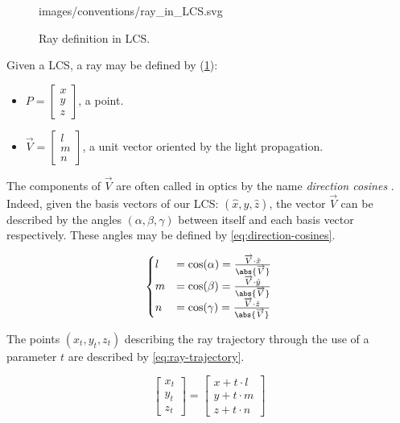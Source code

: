 \begin{figure} \caption{\label{fig:ray-in-LCS} Ray definition
in \gls{LCS}.}

           {images/conventions/ray_in_LCS.svg}
\end{figure}

Given a \gls{LCS}, a ray may be defined by (\cref{fig:ray-in-LCS}):
\begin{itemize}
\item $P = \begin{bmatrix}x \\ y \\ z \end{bmatrix}$, a point.
\item $\overrightarrow{V} = \begin{bmatrix} l \\ m \\ n \end{bmatrix}$, a unit
vector oriented by the light propagation.
\end{itemize}

The components of $\overrightarrow{V}$ are often called in optics by the name
\emph{direction cosines} \cite{mathworld:direction-cosine}. Indeed, given the
basis vectors of our \gls{LCS}: $(\hat{x}, \hat{y}, \hat{z})$, the vector
$\overrightarrow{V}$ can be described by the angles $(\alpha, \beta, \gamma)$
between itself and each basis vector respectively. These angles may be defined
by \cref{eq:direction-cosines}.

\begin{equation} \label{eq:direction-cosines}
\begin{cases}
l &= \cos(\alpha) = \frac{\overrightarrow{V} \cdot \hat{x}}
                          {\abs{\overrightarrow{V}}} \\
m &= \cos(\beta) = \frac{\overrightarrow{V} \cdot \hat{y}}
                         {\abs{\overrightarrow{V}}} \\
n &= \cos(\gamma) = \frac{\overrightarrow{V} \cdot \hat{z}}
                          {\abs{\overrightarrow{V}}}
\end{cases}
\end{equation}

The points $(x_t, y_t, z_t)$ describing the ray trajectory through the use of a parameter $t$
are described by \cref{eq:ray-trajectory}.

\begin{equation} \label{eq:ray-trajectory}
\begin{bmatrix}
x_t \\ y_t \\ z_t
\end{bmatrix} =
\begin{bmatrix}
x + t \cdot l \\
y + t \cdot m \\
z + t \cdot n
\end{bmatrix}
\end{equation}
